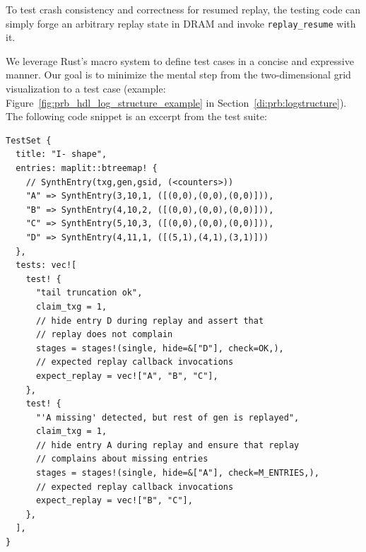 \documentclass[12pt,a4paper,twoside]{book}
\begin{document}
{\begin{description}[noitemsep,leftmargin=1.5cm,labelindent=1cm]
    \item[Crash Consistency Testing]
        To test crash consistency and correctness for resumed replay, the testing code can simply forge an arbitrary replay state in DRAM and invoke \lstinline{replay_resume} with it.
\end{description}

We leverage Rust's macro system to define test cases in a concise and expressive manner.
Our goal is to minimize the mental step from the two-dimensional grid visualization to a test case (example: Figure~\ref{fig:prb_hdl_log_structure_example} in Section~\ref{di:prb:logstructure}).
The following code snippet is an excerpt from the test suite:

\begin{lstlisting}[style=figurepseudocode]
TestSet {
  title: "I- shape",
  entries: maplit::btreemap! {
    // SynthEntry(txg,gen,gsid, (<counters>))
    "A" => SynthEntry(3,10,1, ([(0,0),(0,0),(0,0)])),
    "B" => SynthEntry(4,10,2, ([(0,0),(0,0),(0,0)])),
    "C" => SynthEntry(5,10,3, ([(0,0),(0,0),(0,0)])),
    "D" => SynthEntry(4,11,1, ([(5,1),(4,1),(3,1)]))
  },
  tests: vec![
    test! {
      "tail truncation ok",
      claim_txg = 1,
      // hide entry D during replay and assert that
      // replay does not complain
      stages = stages!(single, hide=&["D"], check=OK,),
      // expected replay callback invocations
      expect_replay = vec!["A", "B", "C"],
    },
    test! {
      "'A missing' detected, but rest of gen is replayed",
      claim_txg = 1,
      // hide entry A during replay and ensure that replay
      // complains about missing entries
      stages = stages!(single, hide=&["A"], check=M_ENTRIES,),
      // expected replay callback invocations
      expect_replay = vec!["B", "C"],
    },
  ],
}
\end{lstlisting}

}
\end{document}
